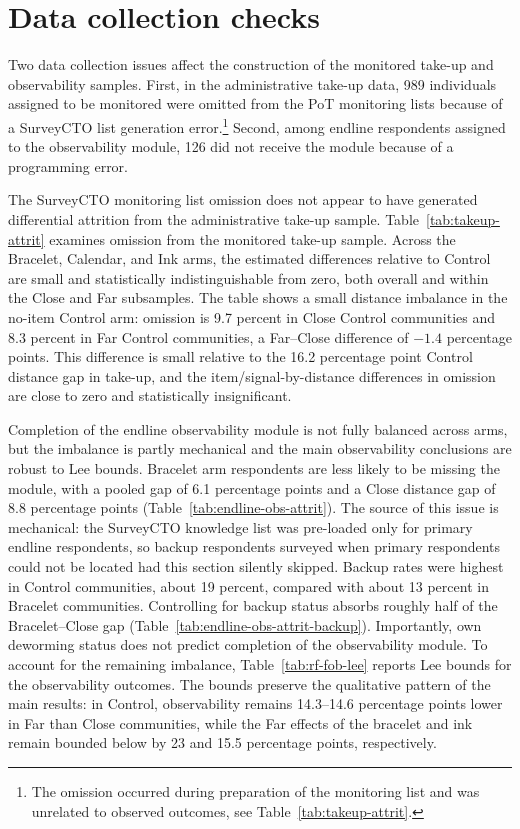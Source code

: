 \documentclass[12pt]{article}
\begin{document}
\section*{Data collection checks}

Two data collection issues affect the construction of the monitored take-up and observability samples. First, in the administrative take-up data, 989 individuals assigned to be monitored were omitted from the PoT monitoring lists because of a SurveyCTO list generation error.\footnote{The omission occurred during preparation of the monitoring list and was unrelated to observed outcomes, see Table~\ref{tab:takeup-attrit}.} Second, among endline respondents assigned to the observability module, 126 did not receive the module because of a programming error.

The SurveyCTO monitoring list omission does not appear to have generated differential attrition from the administrative take-up sample. Table~\ref{tab:takeup-attrit} examines omission from the monitored take-up sample. Across the Bracelet, Calendar, and Ink arms, the estimated differences relative to Control are small and statistically indistinguishable from zero, both overall and within the Close and Far subsamples. The table shows a small distance imbalance in the no-item Control arm: omission is 9.7 percent in Close Control communities and 8.3 percent in Far Control communities, a Far--Close difference of \(-1.4\) percentage points. This difference is small relative to the 16.2 percentage point Control distance gap in take-up, and the item/signal-by-distance differences in omission are close to zero and statistically insignificant.

Completion of the endline observability module is not fully balanced across arms, but the imbalance is partly mechanical and the main observability conclusions are robust to Lee bounds. Bracelet arm respondents are less likely to be missing the module, with a pooled gap of 6.1 percentage points and a Close distance gap of 8.8 percentage points (Table~\ref{tab:endline-obs-attrit}). The source of this issue is mechanical: the SurveyCTO knowledge list was pre-loaded only for primary endline respondents, so backup respondents surveyed when primary respondents could not be located had this section silently skipped. Backup rates were highest in Control communities, about 19 percent, compared with about 13 percent in Bracelet communities. Controlling for backup status absorbs roughly half of the Bracelet--Close gap (Table~\ref{tab:endline-obs-attrit-backup}). Importantly, own deworming status does not predict completion of the observability module. To account for the remaining imbalance, Table~\ref{tab:rf-fob-lee} reports Lee bounds for the observability outcomes. The bounds preserve the qualitative pattern of the main results: in Control, observability remains 14.3--14.6 percentage points lower in Far than Close communities, while the Far effects of the bracelet and ink remain bounded below by 23 and 15.5 percentage points, respectively.
\end{document}

